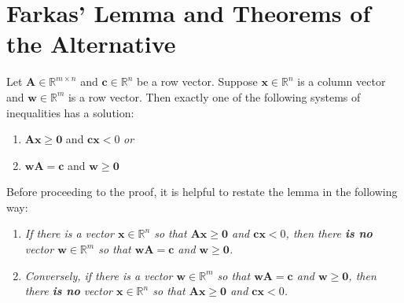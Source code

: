 \section{Farkas' Lemma and Theorems of the Alternative}
\begin{lemma} Let $\mathbf{A} \in \mathbb{R}^{m \times n}$ and $\mathbf{c} \in \mathbb{R}^n$ be a row vector. Suppose $\mathbf{x} \in \mathbb{R}^n$ is a column vector and $\mathbf{w} \in \mathbb{R}^m$ is a row vector. Then exactly one of the following systems of inequalities has a solution:
\begin{enumerate}
\item $\mathbf{A}\mathbf{x} \geq \mathbf{0}$ and $\mathbf{c}\mathbf{x} < 0$ \textit{or}
\item $\mathbf{w}\mathbf{A} = \mathbf{c}$ and $\mathbf{w} \geq \mathbf{0}$
\end{enumerate}
\label{lem:Farkas}
\end{lemma}
\begin{remark} Before proceeding to the proof, it is helpful to restate the lemma in the following way:
\begin{enumerate}
\item 
\textit{If there is a vector $\mathbf{x} \in \mathbb{R}^n$ so that $\mathbf{A}\mathbf{x} \geq \mathbf{0}$ and $\mathbf{c}\mathbf{x} < 0$, then there \textbf{is no} vector $\mathbf{w} \in \mathbb{R}^m$ so that $\mathbf{w}\mathbf{A} = \mathbf{c}$ and $\mathbf{w} \geq \mathbf{0}$. }

\vspace*{1em}
\item
\textit{Conversely, if there is a vector $\mathbf{w} \in \mathbb{R}^m$ so that $\mathbf{w}\mathbf{A} = \mathbf{c}$ and $\mathbf{w} \geq \mathbf{0}$, then there \textbf{is no} vector $\mathbf{x} \in \mathbb{R}^n$ so that $\mathbf{A}\mathbf{x} \geq \mathbf{0}$ and $\mathbf{c}\mathbf{x} < 0$.}
\end{enumerate}
\end{remark}

